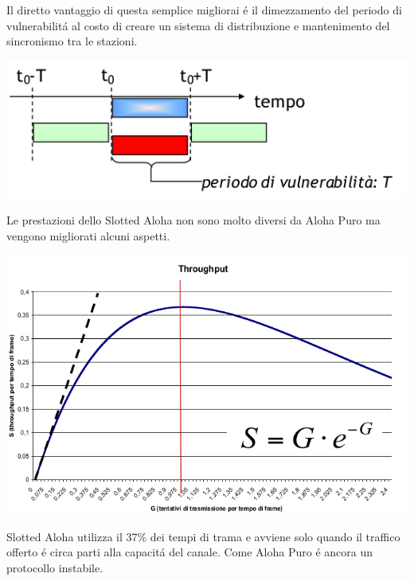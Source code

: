 \documentclass[12pt]{article}
\begin{document}
Il diretto vantaggio di questa semplice migliorai \'e il dimezzamento del periodo di vulnerabilit\'a al costo di creare un 
sistema di distribuzione e mantenimento del sincronismo tra le stazioni.
\begin{center}
	\includegraphics[scale=0.65]{livello_collegamento-img6.png}
\end{center}
Le prestazioni dello Slotted Aloha non sono molto diversi da Aloha Puro ma vengono migliorati alcuni aspetti.
\begin{center}
	\includegraphics[scale=0.6]{livello_collegamento-img7.png}
\end{center}
Slotted Aloha utilizza il 37\% dei tempi di trama e avviene solo quando il traffico offerto \'e circa parti alla capacit\'a 
del canale. Come Aloha Puro \'e ancora un protocollo instabile.

\clearpage
\end{document}
